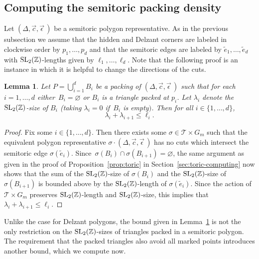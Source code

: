 \documentclass[pdftex]{sigma}
\numberwithin{equation}{section}
\newtheorem{Lemma}[Theorem]{Lemma}
\def\Z{{\mathbb Z}}
\newcommand{\De}{\Delta}
\newcommand{\SL}{{\rm SL}_2(\Z)}
\newcommand{\strep}{(\De,\vec{c},\vec{\epsilon}\,)}
\begin{document}
\subsection{Computing the semitoric packing density}
\label{sec:semitoric-compute}

Let $\strep$ be a semitoric polygon representative. As in the previous subsection we assume that the hidden and Delzant corners are labeled in clockwise order by $p_1,\ldots,p_d$ and that the semitoric edges are labeled by $\tilde{e}_1,\ldots,\tilde{e}_d$ with $\SL$-lengths given by $\ell_1,\ldots,\ell_d$.
Note that the following proof is an instance in which it is helpful to change the directions of the cuts.

\begin{Lemma}\label{lem:st-firstbound}
 Let $P = \bigcup_{i=1}^d B_i$ be a packing of $\strep$ such that for each $i=1,\ldots, d$ either~${B_i=\varnothing}$ or $B_i$ is a triangle packed at $p_i$. Let $\lambda_i$ denote the $\SL$-size of $B_i$ {\rm (}taking $\lambda_i=0$ if~$B_i$ is empty$)$. Then for all $i\in\{1,\ldots,d\}$,
 \[
 \lambda_i + \lambda_{i+1}\leq \ell_i.
 \]
\end{Lemma}

\begin{proof}
Fix some $i\in\{1,\ldots,d\}$. Then there exists some $\sigma\in\mathcal{T}\times G_m$ such that the equivalent polygon representative $\sigma\cdot\strep$ has no cuts which intersect the semitoric edge $\sigma(\tilde{e}_i)$.
Since~$\sigma(B_i)\cap \sigma(B_{i+1}) = \varnothing$, the same argument as given in the proof of Proposition~\ref{prop:toric} in Section~\ref{sec:toric-computing} now shows that the sum of the $\SL$-size of $\sigma(B_i)$ and the $\SL$-size of $\sigma(B_{i+1})$ is bounded above by the $\SL$-length of $\sigma(\tilde{e}_i)$. Since the action of $\mathcal{T}\times G_m$ preserves $\SL$-length and $\SL$-size, this implies that $\lambda_i+\lambda_{i+1}\leq \ell_i$.
\end{proof}



Unlike the case for Delzant polygons, the bound given in Lemma~\ref{lem:st-firstbound} is not the only restriction on the $\SL$-sizes of triangles packed in a semitoric polygon. The requirement that the packed triangles also avoid all marked points introduces another bound, which we compute now.
\end{document}
